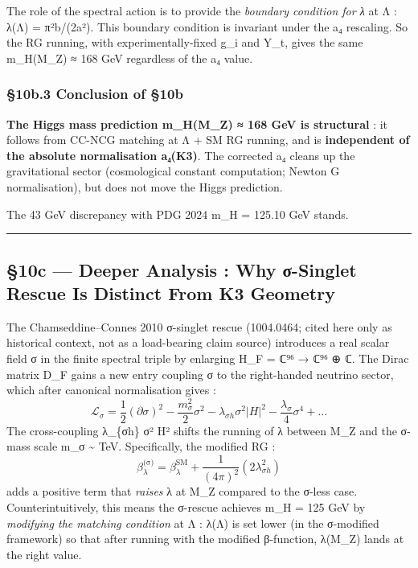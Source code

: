 \documentclass[
  11pt,
  a4paper,
]{article}
\begin{document}
The role of the spectral action is to provide the \emph{boundary condition for λ} at Λ : λ(Λ) = π²b/(2a²). This boundary condition is invariant under the a₄ rescaling. So the RG running, with experimentally-fixed g\_i and Y\_t, gives the same m\_H(M\_Z) ≈ 168 GeV regardless of the a₄ value.

\hypertarget{b.3-conclusion-of-10b}{%
\subsubsection{§10b.3 Conclusion of §10b}\label{b.3-conclusion-of-10b}}

\textbf{The Higgs mass prediction m\_H(M\_Z) ≈ 168 GeV is structural} : it follows from CC-NCG matching at Λ + SM RG running, and is \textbf{independent of the absolute normalisation a₄(K3)}. The corrected a₄ cleans up the gravitational sector (cosmological constant computation; Newton G normalisation), but does not move the Higgs prediction.

The 43 GeV discrepancy with PDG 2024 m\_H = 125.10 GeV stands.

\begin{center}\rule{0.5\linewidth}{0.5pt}\end{center}

\hypertarget{c-deeper-analysis-why-ux3c3-singlet-rescue-is-distinct-from-k3-geometry}{%
\subsection{§10c --- Deeper Analysis : Why σ-Singlet Rescue Is Distinct From K3 Geometry}\label{c-deeper-analysis-why-ux3c3-singlet-rescue-is-distinct-from-k3-geometry}}

The Chamseddine--Connes 2010 σ-singlet rescue (1004.0464; cited here only as historical context, not as a load-bearing claim source) introduces a real scalar field σ in the finite spectral triple by enlarging H\_F = ℂ⁹⁶ → ℂ⁹⁶ ⊕ ℂ. The Dirac matrix D\_F gains a new entry coupling σ to the right-handed neutrino sector, which after canonical normalisation gives :
\[
\mathcal{L}_{\sigma} = \frac{1}{2}(\partial \sigma)^2 - \frac{m_\sigma^2}{2}\sigma^2 - \lambda_{\sigma h} \sigma^2 |H|^2 - \frac{\lambda_\sigma}{4}\sigma^4 + \dots
\]
The cross-coupling λ\_\{σh\} σ² \textbar H\textbar² shifts the running of λ between M\_Z and the σ-mass scale m\_σ \textasciitilde{} TeV. Specifically, the modified RG :
\[
\beta_\lambda^{\text{(σ)}} = \beta_\lambda^{\text{SM}} + \frac{1}{(4\pi)^2}(2 \lambda_{\sigma h}^2)
\]
adds a positive term that \emph{raises} λ at M\_Z compared to the σ-less case. Counterintuitively, this means the σ-rescue achieves m\_H = 125 GeV by \emph{modifying the matching condition} at Λ : λ(Λ) is set lower (in the σ-modified framework) so that after running with the modified β-function, λ(M\_Z) lands at the right value.
\end{document}
